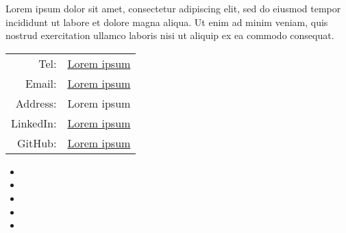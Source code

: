 \documentclass{resume_template}
\begin{document}
	\begin{tcbraster}[grid]
		\begin{tcolorbox}[header,raster multicolumn=2,borderline west={\borderwidth pt}{0pt}{white}]
		\end{tcolorbox}
		\begin{tcolorbox}[header,raster multicolumn=4,borderline east={\borderwidth pt}{0pt}{white}]
		\end{tcolorbox}
		\begin{tcolorbox}[sidebar,raster multicolumn=2]
				\vspace*{-0.1pt}\noindent
				Lorem ipsum dolor sit amet, consectetur adipiscing elit, sed do eiusmod tempor incididunt ut labore et dolore magna aliqua. Ut enim ad minim veniam, quis nostrud exercitation ullamco laboris nisi ut aliquip ex ea commodo consequat.
			 		
				\vspace*{-21pt}
				\begin{center}
					\begin{tabular}{r l}
						Tel: & \href{tel:}{Lorem ipsum} \\
						Email: & \href{mailto:}{Lorem ipsum} \\
						Address: & Lorem ipsum \\
						LinkedIn: & \href{http://www.google.com}{Lorem ipsum} \\
						GitHub: & \href{http://www.google.com}{Lorem ipsum} \\			
					\end{tabular}
				\end{center}
			
				\vspace*{-23.5pt}
				\begin{itemize}
					\item[] 
					\item[] 
					\item[] 
					\item[] 
					\item[] 
				\end{itemize}
			

\end{tcolorbox}
\end{tcbraster}
\end{document}
